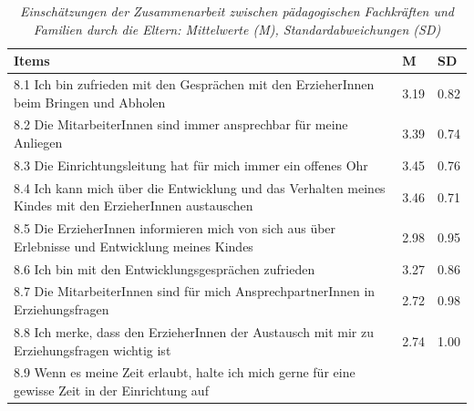 \documentclass[12pt,a4paper]{article}
\begin{document}
\begin{table}[h]
\label{tab_mean}
\caption{\textit{Einschätzungen der Zusammenarbeit zwischen pädagogischen Fachkräften und Familien durch die Eltern: Mittelwerte (M), Standardabweichungen (SD)}}
\begin{tabularx}{\textwidth}{Xll}
\hline 
Items&
  M&
           SD\\\hline  
8.1 Ich bin zufrieden mit den Gesprächen mit den ErzieherInnen
      beim Bringen und Abholen                                                                                                                                                                                                             &
 3.19&  
           0.82   \\      
8.2 Die MitarbeiterInnen sind immer ansprechbar für meine   
      Anliegen                                                                                                                                                &
 3.39&
           0.74\\
8.3 Die Einrichtungsleitung hat für mich immer ein offenes Ohr &             
 3.45&
           0.76\\
8.4 Ich kann mich über die Entwicklung und das Verhalten
      meines Kindes mit den ErzieherInnen austauschen                                                                                             &
 3.46&
           0.71\\
8.5 Die ErzieherInnen informieren mich von sich aus über
      Erlebnisse und Entwicklung meines Kindes                                                                                                                                         &
 2.98&
           0.95\\
8.6 Ich bin mit den Entwicklungsgesprächen zufrieden                                          &
 3.27&
          0.86\\
8.7 Die MitarbeiterInnen sind für mich AnsprechpartnerInnen in             
      Erziehungsfragen                                                                                   &
 2.72&
          0.98\\
8.8 Ich merke, dass den ErzieherInnen der Austausch mit mir zu
      Erziehungsfragen wichtig ist                                                                 &
 2.74&
          1.00\\
8.9 Wenn es meine Zeit erlaubt, halte ich mich gerne für eine
      gewisse Zeit in der Einrichtung auf                                                                                                                  &

\end{tabularx}
\end{table}
\end{document}
